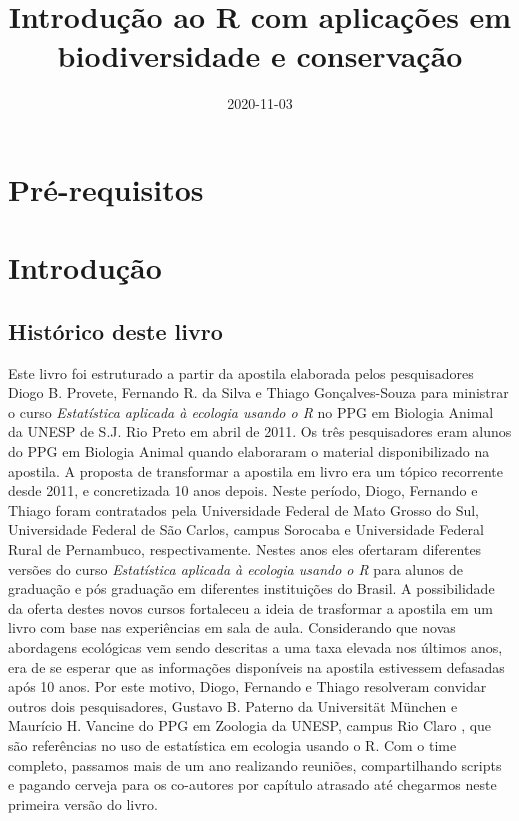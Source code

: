 \documentclass[
]{book}
\title{Introdução ao R com aplicações em biodiversidade e conservação}
\author{}
\date{\vspace{-2.5em}2020-11-03}
\begin{document}
\maketitle

{
\setcounter{tocdepth}{1}
\tableofcontents
}
\hypertarget{pruxe9-requisitos}{%
\chapter{Pré-requisitos}\label{pruxe9-requisitos}}

\hypertarget{introduuxe7uxe3o}{%
\chapter{Introdução}\label{introduuxe7uxe3o}}

\hypertarget{histuxf3rico-deste-livro}{%
\section{Histórico deste livro}\label{histuxf3rico-deste-livro}}

Este livro foi estruturado a partir da apostila elaborada pelos pesquisadores Diogo B. Provete, Fernando R. da Silva e Thiago Gonçalves-Souza para ministrar o curso \emph{Estatística aplicada à ecologia usando o R} no PPG em Biologia Animal da UNESP de S.J. Rio Preto em abril de 2011. Os três pesquisadores eram alunos do PPG em Biologia Animal quando elaboraram o material disponibilizado na apostila. A proposta de transformar a apostila em livro era um tópico recorrente desde 2011, e concretizada 10 anos depois. Neste período, Diogo, Fernando e Thiago foram contratados pela Universidade Federal de Mato Grosso do Sul, Universidade Federal de São Carlos, campus Sorocaba e Universidade Federal Rural de Pernambuco, respectivamente. Nestes anos eles ofertaram diferentes versões do curso \emph{Estatística aplicada à ecologia usando o R} para alunos de graduação e pós graduação em diferentes instituições do Brasil. A possibilidade da oferta destes novos cursos fortaleceu a ideia de trasformar a apostila em um livro com base nas experiências em sala de aula. Considerando que novas abordagens ecológicas vem sendo descritas a uma taxa elevada nos últimos anos, era de se esperar que as informações disponíveis na apostila estivessem defasadas após 10 anos. Por este motivo, Diogo, Fernando e Thiago resolveram convidar outros dois pesquisadores, Gustavo B. Paterno da Universität München e Maurício H. Vancine do PPG em Zoologia da UNESP, campus Rio Claro , que são referências no uso de estatística em ecologia usando o R. Com o time completo, passamos mais de um ano realizando reuniões, compartilhando scripts e pagando cerveja para os co-autores por capítulo atrasado até chegarmos neste primeira versão do livro.
\end{document}
